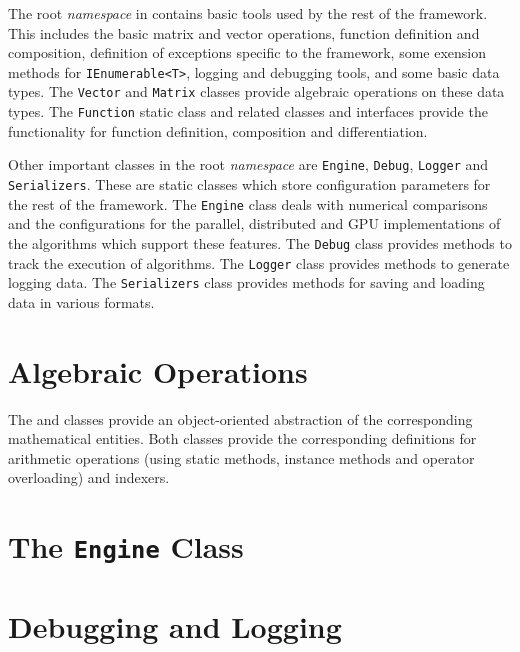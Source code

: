 The root \emph{namespace} in \sct contains
basic tools used by the rest of the framework. This
includes the basic matrix and vector operations,
function definition and composition, 
definition of exceptions specific to the
framework, some exension methods for \texttt{IEnumerable<T>},
logging and debugging tools, and some basic data types.
The \texttt{Vector} and \texttt{Matrix} classes provide
algebraic operations on these data types. The \texttt{Function}
static class and related classes and interfaces provide
the functionality for function definition, composition and
differentiation.

Other important classes in the root \emph{namespace} are
\texttt{Engine}, \texttt{Debug}, \texttt{Logger} and
\texttt{Serializers}.
These are static classes which store configuration
parameters for the rest of the framework. The \texttt{Engine}
class deals with numerical comparisons and the configurations
for the parallel, distributed and GPU implementations of the
algorithms which support these features. The \texttt{Debug}
class provides methods to track the execution of algorithms.
The \texttt{Logger} class provides methods to generate
logging data. The \texttt{Serializers} class provides methods
for saving and loading data in various formats.

\section{Algebraic Operations}

The  and 
 classes provide an
object-oriented abstraction of the corresponding
mathematical entities. Both classes provide the corresponding
definitions for arithmetic operations (using static methods, instance
methods and operator overloading) and indexers.

\section{The \texttt{Engine} Class}

\section{Debugging and Logging}

